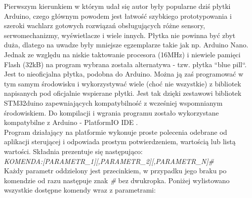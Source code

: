 Pierwszym kierunkiem w którym udał się autor były popularne dziś płytki Arduino, czego głównym powodem jest łatwość szybkiego prototypowania i szeroki wachlarz gotowych rozwiązań obsługujących różne sensory, serwomechanizmy, wyświetlacze i wiele innych. Płytka nie powinna być zbyt duża, dlatego na uwadze były mniejsze egzemplarze takie jak np. Arduino Nano. Jednak ze względu na niskie taktowanie procesora (16MHz) i niewiele pamięci Flash (32kB) na program wybrana została alternatywa - tzw. płytka ``blue pill``\cite{bluepill}. Jest to nieoficjalna płytka, podobna do Arduino. Można ją zaś programować w tym samym środowisku i wykorzystywać wiele (choć nie wszystkie) z bibliotek napisanych pod oficjalnie wspierane płytki. Jest tak dzięki zestawowi bibliotek STM32duino \cite{stm32duino-github} zapewniających kompatybilność z wcześniej wspomnianym środowiskiem. Do kompilacji i wgrania programu zostało wykorzystane kompatybilne z Arduino - PlatformIO IDE \cite{platformio}.
\\

Program działający na platformie wykonuje proste polecenia odebrane od aplikacji sterującej i odpowiada prostym potwierdzeniem, wartością lub listą wartości. 
Składnia prezentuje się następująco: \\

\emph{KOMENDA:[PARAMETR\_1][,PARAMETR\_2][,PARAMETR\_N]\#}\\

Każdy parametr oddzielony jest przecinkiem, w przypadku jego braku po komendzie od razu następuje znak \emph{\#} bez dwukropka.
Poniżej wylistowano wszystkie dostępne komendy wraz z parametrami:

